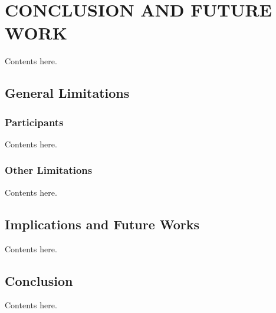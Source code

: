 \chapter {CONCLUSION AND FUTURE WORK}
\label {chp:conclusion}
Contents here.
\section {General Limitations}
	\subsection {Participants}
	Contents here. 
	
	\subsection {Other Limitations}
	Contents here.  
		
\section {Implications and Future Works}
Contents here.

\section {Conclusion}
Contents here.




